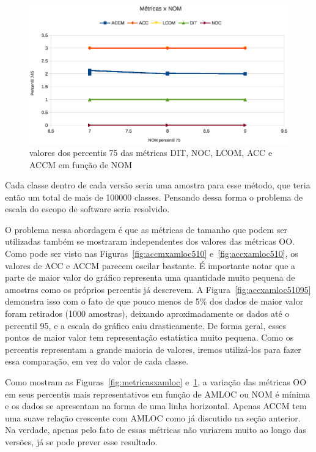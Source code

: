 \begin{figure}[!htb]
\centering
\includegraphics [keepaspectratio=true,scale=0.7]{figuras/metricasxnom.eps}
\caption{valores dos percentis 75 das métricas DIT, NOC, LCOM, ACC e ACCM em função de NOM}
\label{fig:metricasxnom}
\end{figure}

Cada classe dentro de cada versão seria uma amostra para esse método, que teria então um total de mais de 100000 classes. Pensando dessa forma o problema de escala do escopo de software seria resolvido.

O problema nessa abordagem é que as métricas de tamanho que podem ser utilizadas também se mostraram independentes dos valores das métricas OO. Como pode ser visto nas Figuras~\ref{fig:accmxamloc510} e~\ref{fig:accxamloc510}, os valores de ACC e ACCM parecem oscilar bastante. É importante notar que a parte de maior valor do gráfico representa uma quantidade muito pequena de amostras como os próprios percentis já descrevem. A Figura~\ref{fig:accxamloc51095} demonstra isso com o fato de que pouco menos de 5\% dos dados de maior valor foram retirados (1000 amostras), deixando aproximadamente os dados até o percentil 95, e a escala do gráfico caiu drasticamente. De forma geral, esses pontos de maior valor tem representação estatística muito pequena. Como os percentis representam a grande maioria de valores, iremos utilizá-los para fazer essa comparação, em vez do valor de cada classe.

Como mostram as Figuras~\ref{fig:metricasxamloc} e~\ref{fig:metricasxnom}, a variação das métricas OO em seus percentis mais representativos em função de AMLOC ou NOM é mínima e os dados se apresentam na forma de uma linha horizontal. Apenas ACCM tem uma suave relação crescente com AMLOC como já discutido na seção anterior. Na verdade, apenas pelo fato de essas métricas não variarem muito ao longo das versões, já se pode prever esse resultado.

